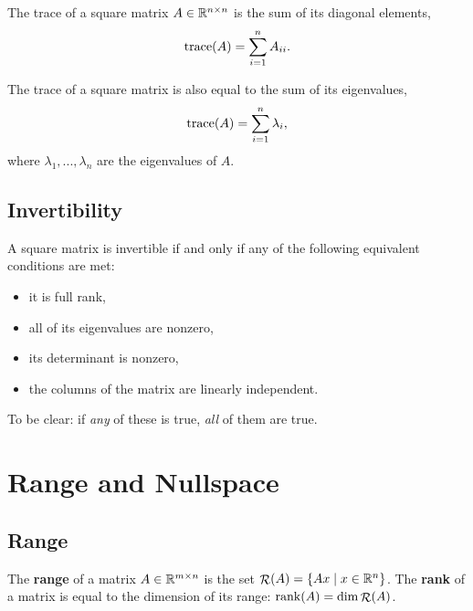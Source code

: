 \documentclass[12pt]{article}
\begin{document}
The trace of a square matrix $A \in { {\mathbb R}^{n \times n} }$ is the sum of its diagonal elements,
%
\begin{equation*}
\mathop{\mathrm{trace}}\nolimits(A) = \sum_{i=1}^n A_{ii}.
\end{equation*}

The trace of a square matrix is also equal to the sum of its eigenvalues,
%
\begin{equation*}
\mathop{\mathrm{trace}}\nolimits(A) = \sum_{i=1}^n \lambda_i,
\end{equation*}
%
where $\lambda_1, ..., \lambda_n$ are the eigenvalues of $A$. 

\subsection{Invertibility}

A square matrix is invertible if and only if any of the following equivalent conditions are met:
%
\begin{itemize}
\item it is full rank,
\item all of its eigenvalues are nonzero,
\item its determinant is nonzero,
\item the columns of the matrix are linearly independent.
\end{itemize}

To be clear: if \textit{any} of these is true, \textit{all} of them are true.

\pagebreak

\section{Range and Nullspace}

\subsection{Range}

The \textbf{range} of a matrix $A \in { {\mathbb R}^{m\times n} }$ is the set $\mathop{\mathcal{R}}\nolimits(A) = \{Ax \; | \; x \in { {\mathbb R}^{n} }\}$. The \textbf{rank} of a matrix is equal to the dimension of its range: $\mathop{\mathrm{rank}}\nolimits(A) = \dim \mathop{\mathcal{R}}\nolimits(A)$. 
\end{document}
